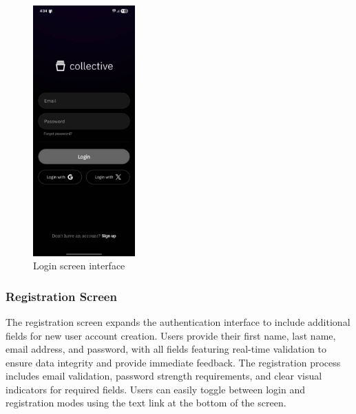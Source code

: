 \begin{figure}[H]
\centering
\includegraphics[width=0.35\textwidth]{files/imgs/prototype/auth_login.jpeg}
\caption{Login screen interface}
\label{fig:login-screen}
\end{figure}

\subsubsection{Registration Screen}

The registration screen expands the authentication interface to include additional fields for new user account creation. Users provide their first name, last name, email address, and password, with all fields featuring real-time validation to ensure data integrity and provide immediate feedback. The registration process includes email validation, password strength requirements, and clear visual indicators for required fields. Users can easily toggle between login and registration modes using the text link at the bottom of the screen.

